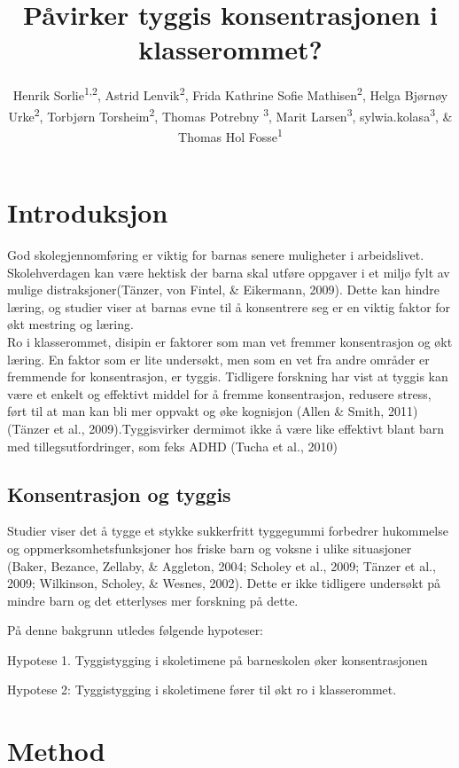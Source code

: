 \documentclass[english,jou]{apa6}
\author{Henrik Sorlie\textsuperscript{1,2}, Astrid Lenvik\textsuperscript{2}, Frida Kathrine Sofie Mathisen\textsuperscript{2}, Helga Bjørnøy Urke\textsuperscript{2}, Torbjørn Torsheim\textsuperscript{2}, Thomas Potrebny \textsuperscript{3}, Marit Larsen\textsuperscript{3}, sylwia.kolasa\textsuperscript{3}, \& Thomas Hol Fosse\textsuperscript{1}}
\affiliation{
\vspace{0.5cm}
\textsuperscript{1} Forsvarets hogskole\\\textsuperscript{2} Universitetet i Bergen\\\textsuperscript{3} Hoegskulen på Vestlandet\\\textsuperscript{4} Norce}
\title{Påvirker tyggis konsentrasjonen i klasserommet?}
\date{}
\begin{document}
\maketitle

\hypertarget{introduksjon}{%
\section{Introduksjon}\label{introduksjon}}

God skolegjennomføring er viktig for barnas senere muligheter i arbeidslivet.
Skolehverdagen kan være hektisk der barna skal utføre oppgaver i et miljø fylt av mulige distraksjoner(Tänzer, von Fintel, \& Eikermann, 2009).
Dette kan hindre læring, og studier viser at barnas evne til å konsentrere seg er en viktig faktor for økt mestring og læring.\\
Ro i klasserommet, disipin er faktorer som man vet fremmer konsentrasjon og økt læring.
En faktor som er lite undersøkt, men som en vet fra andre områder er fremmende for konsentrasjon, er tyggis.
Tidligere forskning har vist at tyggis kan være et enkelt og effektivt middel for å fremme konsentrasjon, redusere stress, ført til at man kan bli mer oppvakt og øke kognisjon (Allen \& Smith, 2011)(Tänzer et al., 2009).Tyggisvirker dermimot ikke å være like effektivt blant barn med tillegsutfordringer, som feks ADHD (Tucha et al., 2010)

\hypertarget{konsentrasjon-og-tyggis}{%
\subsection{Konsentrasjon og tyggis}\label{konsentrasjon-og-tyggis}}

Studier viser det å tygge et stykke sukkerfritt tyggegummi forbedrer hukommelse og oppmerksomhetsfunksjoner hos friske barn og voksne i ulike situasjoner (Baker, Bezance, Zellaby, \& Aggleton, 2004; Scholey et al., 2009; Tänzer et al., 2009; Wilkinson, Scholey, \& Wesnes, 2002).
Dette er ikke tidligere undersøkt på mindre barn og det etterlyses mer forskning på dette.

På denne bakgrunn utledes følgende hypoteser:

Hypotese 1. Tyggistygging i skoletimene på barneskolen øker konsentrasjonen

Hypotese 2: Tyggistygging i skoletimene fører til økt ro i klasserommet.

\hypertarget{method}{%
\section{Method}\label{method}}
\end{document}
